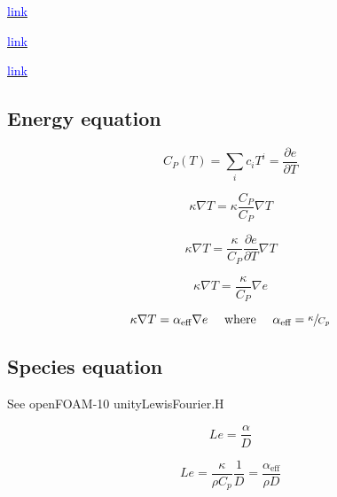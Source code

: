\documentclass[a4paper, 12pt]{article}
\numberwithin{equation}{section}
\newcommand{\code}{\fontfamily{pcr}\selectfont}
\newcommand{\blue}[1]{\textcolor{blue}{#1}}
\begin{document}
        \href{
        https://www.cfd-online.com/Forums/openfoam-solving/219609-rho-buoyant-solver-p-p\_rgh-ph\_rgh.html
        }{\blue{link}}

        \href{
        https://www.openfoam.com/documentation/guides/latest/api/prghTotalHydrostaticPressureFvPatchScalarField\_8H\_source.html
        }{\blue{link}}

        \href{
        https://www.openfoam.com/documentation/guides/latest/api/classFoam\_1\_1prghTotalHydrostaticPressureFvPatchScalarField.html
        }{\blue{link}}

    \subsection{Energy equation}

        \begin{equation}
        C_P (T) = \sum_i c_i T^i = \frac{\partial e}{\partial T}
        \end{equation}

        \begin{equation}
        \kappa \nabla T = \kappa \frac{C_P}{C_P} \nabla T
        \end{equation}

        \begin{equation}
        \kappa \nabla T = \frac{\kappa}{C_P} \frac{\partial e}{\partial T} \nabla T
        \end{equation}

        \begin{equation}
        \kappa \nabla T = \frac{\kappa}{C_P} \nabla e
        \end{equation}

        \begin{equation}
        \kappa \nabla T = \alpha_\text{eff} \nabla e \quad \text{ where } \quad  \alpha_\text{eff} = \sfrac{\kappa}{C_p}
        \end{equation}

    \subsection{Species equation}

        See openFOAM-10 {\code unityLewisFourier.H}

        \begin{equation}
        Le = \frac{\alpha}{D}
        \end{equation}

        \begin{equation}
        Le = \frac{\kappa}{\rho C_p} \frac{1}{D} = \frac{\alpha_\text{eff}}{\rho D}
        \end{equation}
\end{document}
